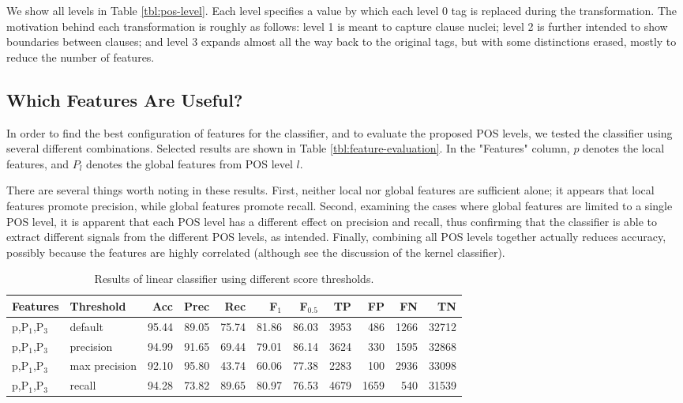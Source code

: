\documentclass[11pt]{article}
\begin{document}
We show all levels in Table \ref{tbl:pos-level}. Each level specifies
a value by which each level 0 tag is replaced during the
transformation. The motivation behind each transformation is roughly as follows: level
1 is meant to capture clause nuclei; level 2 is further intended to
show boundaries between clauses; and level 3 expands almost all the
way back to the original tags, but with some distinctions erased,
mostly to reduce the number of features.

\subsection{Which Features Are Useful?}
\label{sec-4-3}

In order to find the best configuration of features for the
classifier, and to evaluate the proposed POS levels, we tested the
classifier using several different combinations. Selected results are
shown in Table \ref{tbl:feature-evaluation}. In the "Features" column,
$p$ denotes the local features, and $P_{l}$ denotes the global
features from POS level $l$. 

There are several things worth noting in these results. First, neither local nor
global features are sufficient alone; it appears that local features promote
precision, while global features promote recall. Second, examining the cases
where global features are limited to a single POS level, it is apparent that
each POS level has a different effect on precision and recall, thus confirming
that the classifier is able to extract different signals from the different POS
levels, as intended. Finally, combining all POS levels together actually reduces
accuracy, possibly because the features are highly correlated (although see the
discussion of the kernel classifier).

\begin{table}[htbp]

\begin{tabular}{llrrrrrrrrr}
{\bf Features} & {\bf Threshold} & {\bf Acc} & {\bf Prec} & {\bf Rec} & {\bf F$_{\text{1}}$} & {\bf F$_{\text{0.5}}$} & {\bf TP} & {\bf FP} & {\bf FN} & {\bf TN} \\
\hline
p,P$_{\text{1}}$,P$_{\text{3}}$ & default & 95.44 & 89.05 & 75.74 & 81.86 & 86.03 & 3953 & 486 & 1266 & 32712\\
p,P$_{\text{1}}$,P$_{\text{3}}$ & precision & 94.99 & 91.65 & 69.44 & 79.01 & 86.14 & 3624 & 330 & 1595 & 32868\\
p,P$_{\text{1}}$,P$_{\text{3}}$ & max precision & 92.10 & 95.80 & 43.74 & 60.06 & 77.38 & 2283 & 100 & 2936 & 33098\\
p,P$_{\text{1}}$,P$_{\text{3}}$ & recall & 94.28 & 73.82 & 89.65 & 80.97 & 76.53 & 4679 & 1659 & 540 & 31539\\
\end{tabular}

\caption{Results of linear classifier using different score thresholds.}
\label{tbl:classifier-results-linear}
\end{table}
\end{document}
